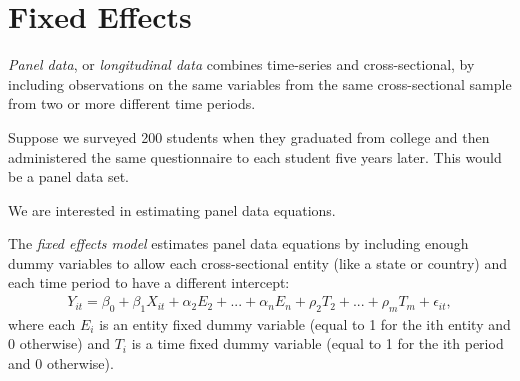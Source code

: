 \documentclass[11pt,twoside,openany]{memoir}
\begin{document}
    \section*{Fixed Effects}
        \begin{definition}
            \textit{Panel data}, or \textit{longitudinal data} combines time-series and cross-sectional, by including observations on the same variables from the same cross-sectional sample from two or more different time periods.
        \end{definition}

        \begin{example}
            Suppose we surveyed 200 students when they graduated from college and then administered the same questionnaire to each student five years later. This would be a panel data set.
        \end{example}

        We are interested in estimating panel data equations.

        \begin{definition}
            The \textit{fixed effects model} estimates panel data equations by including enough dummy variables to allow each cross-sectional entity (like a state or country) and each time period to have a different intercept:
                \begin{equation*}
                \begin{split}
                    Y_{it} = \beta_0 + \beta_1 X_{it} + \alpha_2 E_2 + ... + \alpha_n E_n + \rho_2 T_2 + ... + \rho_m T_m + \epsilon_{it},
                \end{split}
                \end{equation*}
            where each $E_i$ is an entity fixed dummy variable (equal to 1 for the ith entity and 0 otherwise) and $T_i$ is a time fixed dummy variable (equal to 1 for the ith period and 0 otherwise).
        \end{definition}
\end{document}
